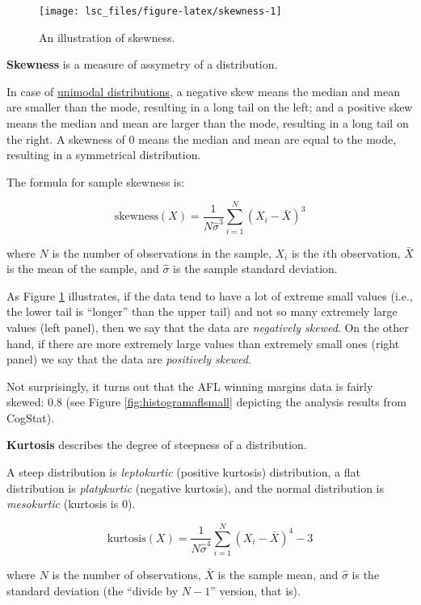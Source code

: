 \documentclass[
  11pt,
  a4paper,
  twoside,symmetric,openright]{book}
\theoremstyle{break}
\theoremstyle{break}
\begin{document}
\begin{figure}[H]

{\centering \texttt{[image: lsc\_files/figure-latex/skewness-1]} 

}

\caption{An illustration of skewness.}\label{fig:skewness}
\end{figure}

\begin{definition}[Skewness]
\protect\hypertarget{def:defskewness}{}\label{def:defskewness}\textbf{Skewness} is a measure of assymetry of a distribution.

In case of \protect\hyperlink{calloutmultimodal}{unimodal distributions}, a negative skew means the median and mean are smaller than the mode, resulting in a long tail on the left; and a positive skew means the median and mean are larger than the mode, resulting in a long tail on the right. A skewness of 0 means the median and mean are equal to the mode, resulting in a symmetrical distribution.

The formula for sample skewness is:

\[
\mbox{skewness}(X) = \frac{1}{N \hat\sigma^3} \sum_{i=1}^N \left( X_i - \bar{X} \right)^3
\]

where \(N\) is the number of observations in the sample, \(X_i\) is the \(i\)th observation, \(\bar{X}\) is the mean of the sample, and \(\hat\sigma\) is the sample standard deviation.
\end{definition}

As Figure \ref{fig:skewness} illustrates, if the data tend to have a lot of extreme small values (i.e., the lower tail is ``longer'' than the upper tail) and not so many extremely large values (left panel), then we say that the data are \emph{negatively skewed}. On the other hand, if there are more extremely large values than extremely small ones (right panel) we say that the data are \emph{positively skewed}.

Not surprisingly, it turns out that the AFL winning margins data is fairly skewed: \(0.8\) (see Figure \ref{fig:histogramaflsmall} depicting the analysis results from CogStat).

\begin{definition}[Kurtosis]
\protect\hypertarget{def:defkurtosis}{}\label{def:defkurtosis}\textbf{Kurtosis} describes the degree of steepness of a distribution.

A steep distribution is \emph{leptokurtic} (positive kurtosis) distribution, a flat distribution is \emph{platykurtic} (negative kurtosis), and the normal distribution is \emph{mesokurtic} (kurtosis is 0).

\[
\mbox{kurtosis}(X) = \frac{1}{N \hat\sigma^4} \sum_{i=1}^N \left( X_i - \bar{X} \right)^4 - 3
\]

where \(N\) is the number of observations, \(\bar{X}\) is the sample mean, and \(\hat{\sigma}\) is the standard deviation (the ``divide by \(N-1\)'' version, that is).
\end{definition}
\end{document}
